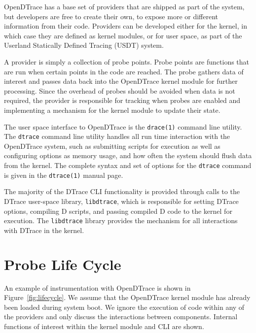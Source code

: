 OpenDTrace has a base set of providers that are shipped as part of the
system,
but developers are free to
create their own, to expose more or different information from their
code. Providers can be developed either for the kernel, in which case
they are defined as kernel modules, or for user space, as part of the
Userland Statically Defined Tracing (USDT) system.

A provider is simply a collection of probe points. Probe points are
functions that are run when certain points in the code are
reached. The probe gathers data of interest and passes data back into
the OpenDTrace kernel module for further processing. Since the
overhead of probes should be avoided when data is not required, the
provider is responsible for tracking when probes are enabled and
implementing a mechanism for the kernel module to update their state.

The user space interface to OpenDTrace is the \texttt{drace(1)}
command line utility. The \texttt{dtrace} command line utility handles
all run time interaction with the OpenDTrace system, such as
submitting scripts for execution as well as configuring options as
memory usage, and how often the system should flush data from the
kernel.  The complete syntax and set of options for the
\texttt{dtrace} command is given in the \texttt{dtrace(1)} manual
page.

The majority of the DTrace CLI functionality is provided through calls
to the DTrace user-space library, \texttt{libdtrace}, which is
responsible for setting DTrace options, compiling D scripts, and
passing compiled D code to the kernel for execution. The
\texttt{libdtrace} library provides the mechanism for all interactions
with DTrace in the kernel.

\section{Probe Life Cycle}
\label{sec:lifecycle}

An example of instrumentation with OpenDTrace is shown in
Figure~\ref{fig:lifecycle}. We assume that the OpenDTrace kernel
module has already been loaded during system boot. We ignore the
execution of code within any of the providers and only discuss the
interactions between components. Internal functions of interest within
the kernel module and CLI are shown.

